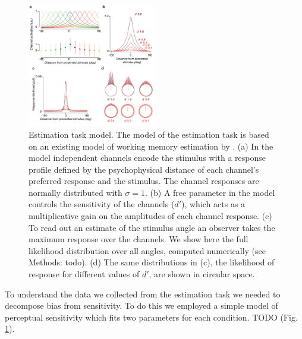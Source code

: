 \begin{figure}
\centering
\includegraphics[keepaspectratio,width=0.5\textwidth]{figs_c4/f3_TCC_model.pdf}
\caption[Estimation task model]{Estimation task model. The model of the estimation task is based on an existing model of working memory estimation by \citet{Schurgin2018-vi}. (a) In the model independent channels encode the stimulus with a response profile defined by the psychophysical distance of each channel's preferred response and the stimulus. The channel responses are normally distributed with $\sigma=1$. (b) A free parameter in the model controls the sensitivity of the channels ($d'$), which acts as a multiplicative gain on the amplitudes of each channel response. (c) To read out an estimate of the stimulus angle an observer takes the maximum response over the channels. We show here the full likelihood distribution over all angles, computed numerically (see Methods: todo). (d) The same distributions in (c), the likelihood of response for different values of $d'$, are shown in circular space.}
\label{fig:c4f5}
\end{figure}

To understand the data we collected from the estimation task we needed to decompose bias from sensitivity. To do this we employed a simple model of perceptual sensitivity which fits two parameters for each condition. TODO (Fig. \ref{fig:c4f5}). 

